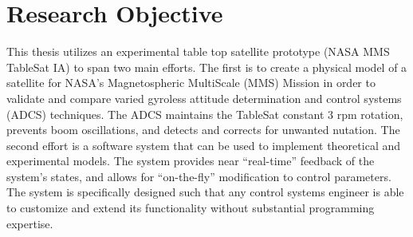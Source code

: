 











\section{Research Objective}
\label{sec:ResearchObjective}

This thesis utilizes an experimental table top satellite prototype (NASA MMS TableSat IA) to span two main efforts.  The first is to create a physical model of a satellite for NASA's Magnetospheric MultiScale (MMS) Mission in order to validate and compare varied gyroless attitude determination and control systems (ADCS) techniques.  The ADCS maintains the TableSat constant 3 rpm rotation, prevents boom oscillations, and detects and corrects for unwanted nutation.  The second effort is a software system that can be used to implement theoretical and experimental models.  The system provides near ``real-time'' feedback of the system's states, and allows for ``on-the-fly'' modification to control parameters.  The system is specifically designed such that any control systems engineer is able to customize and extend its functionality without substantial programming expertise.


